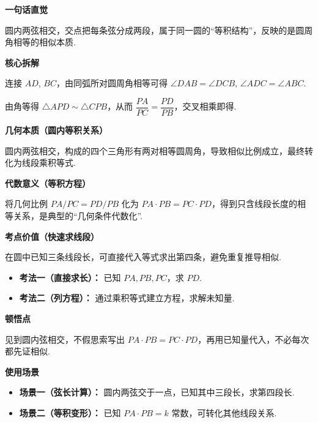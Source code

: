 \begin{explanationbox}

	\textbf{\textcolor{CExplanation}{一句话直觉}}

	圆内两弦相交，交点把每条弦分成两段，属于同一圆的“等积结构”，反映的是圆周角相等的相似本质.

	\medskip
	\textbf{\textcolor{CExplanation}{核心拆解}}
	\begin{description}[style=nextline, leftmargin=2.8em, labelsep=0.5em, itemsep=0.45em]
		\item[\textbf{要点一（利用圆周角）：}] 连接 $AD$, $BC$，由同弧所对圆周角相等可得 $\angle DAB = \angle DCB$, $\angle ADC = \angle ABC$.
		\item[\textbf{要点二（三角形相似）：}] 由角等得 $\triangle APD \sim \triangle CPB$，从而 $\dfrac{PA}{PC} = \dfrac{PD}{PB}$，交叉相乘即得.
	\end{description}

	\medskip
	\textbf{\textcolor{CExplanation}{几何本质（圆内等积关系）}}

	圆内两弦相交，构成的四个三角形有两对相等圆周角，导致相似比例成立，最终转化为线段乘积等式.

	\medskip
	\textbf{\textcolor{CExplanation}{代数意义（等积方程）}}

	将几何比例 $PA/PC = PD/PB$ 化为 $PA\cdot PB = PC\cdot PD$，得到只含线段长度的相等关系，是典型的“几何条件代数化”.

	\medskip
	\textbf{\textcolor{CExplanation}{考点价值（快速求线段）}}

	在圆中已知三条线段长，可直接代入等式求出第四条，避免重复推导相似.

	\begin{itemize}[leftmargin=*, itemsep=0.5em, topsep=0.4em]
		\item \textbf{考法一（直接求长）：} 已知 $PA,PB,PC$，求 $PD$.
		\item \textbf{考法二（列方程）：} 通过乘积等式建立方程，求解未知量.
	\end{itemize}

	\medskip
	\textbf{\textcolor{CExplanation}{顿悟点}}

	见到圆内弦相交，不假思索写出 $PA\cdot PB = PC\cdot PD$，再用已知量代入，不必每次都先证相似.

	\medskip
	\textbf{\textcolor{CExplanation}{使用场景}}
	\begin{itemize}[leftmargin=*, itemsep=0.5em, topsep=0.4em]
		\item \textbf{场景一（弦长计算）：} 圆内两弦交于一点，已知其中三段长，求第四段长.
		\item \textbf{场景二（等积变形）：} 已知 $PA\cdot PB = k$ 常数，可转化其他线段关系.
	\end{itemize}

\end{explanationbox}
